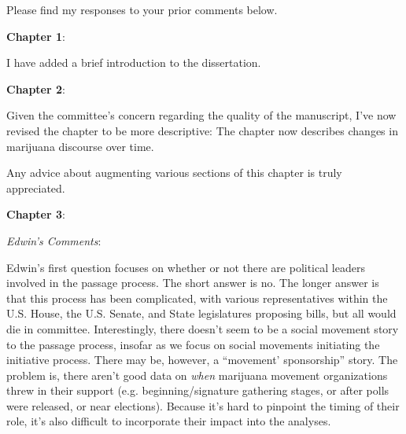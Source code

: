 \documentclass[12pt,stdletter,dateno,sigleft]{newlfm} %
\begin{document}
\begin{newlfm}


Please find my responses to your prior comments below. \newline%


\textbf{Chapter 1}:

I have added a brief introduction to the dissertation. \newline 


\textbf{Chapter 2}: 

Given the committee's concern regarding the quality of the manuscript, I've now revised the chapter to be more descriptive: The chapter now describes changes in marijuana discourse over time. 

Any advice about augmenting various sections of this chapter is truly appreciated. \newline




\textbf{Chapter 3}: 

\textit{Edwin's Comments}:

Edwin's first question focuses on whether or not there are political leaders involved in the passage process. The short answer is no. The longer answer is that this process has been complicated, with various representatives within the U.S. House, the U.S. Senate, and State legislatures proposing bills, but all would die in committee. Interestingly, there doesn't seem to be a social movement story to the passage process, insofar as we focus on social movements initiating the initiative process. There may be, however, a ``movement' sponsorship'' story. The problem is, there aren't good data on \textit{when} marijuana movement organizations threw in their support (e.g. beginning/signature gathering stages, or after polls were released, or near elections). Because it's hard to pinpoint the timing of their role, it's also difficult to incorporate their impact into the analyses.


\end{newlfm}
\end{document}
